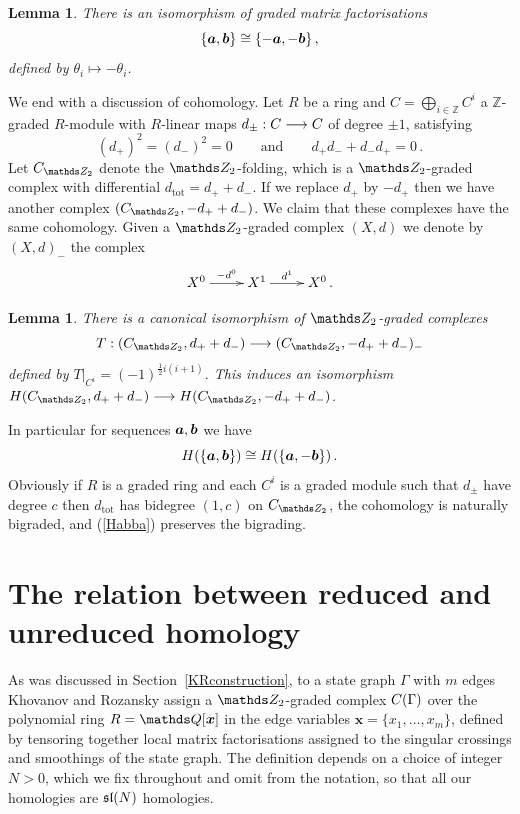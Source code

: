 \documentclass{compositio}
\newtheorem{lemma}[theorem]{Lemma}
\theoremstyle{definition}
\numberwithin{equation}{section}
\begin{document}
\begin{lemma}\label{lemma:cyclickos3} There is an isomorphism of graded matrix factorisations
\[
\{ \boldsymbol{a}, \boldsymbol{b} \} \cong \{ -\boldsymbol{a}, - \boldsymbol{b} \}\,,
\]
defined by $\theta_i \longmapsto - \theta_i$.
\end{lemma}

We end with a discussion of cohomology. Let $R$ be a ring and $C = \bigoplus_{i \in \mathds{Z}} C^i$ a $\mathds{Z}$-graded $R$-module with $R$-linear maps $d_{\pm}: C \longrightarrow C$ of degree $\pm 1$, satisfying
\[
(d_+)^2 = (d_{-})^2 = 0 \qquad \text{and} \qquad d_{+}d_{-} + d_{-}d_{+} = 0 \, .
\]
Let $C_{\Ztwo}$ denote the $\Ztwo$-folding, which is a $\Ztwo$-graded complex with differential $d_{\text{tot}} = d_+ + d_{-}$. If we replace $d_{+}$ by $-d_{+}$ then we have another complex $(C_{\Ztwo}, -d_{+} + d_{-})$. We claim that these complexes have the same cohomology. Given a $\Ztwo$-graded complex $(X,d)$ we denote by $(X,d)_{-}$ the complex
\[
\xymatrix{%
X^0 \ar[r]^-{-d^0} & X^1 \ar[r]^-{d^1} & X^0\,.
}
\]

\begin{lemma}\label{lemma:cyclickoszulsign} There is a canonical isomorphism of $\Ztwo$-graded complexes
\[
T: (C_{\Ztwo}, d_{+} + d_{-}) \lto (C_{\Ztwo}, -d_{+} + d_{-})_{-}
\]
defined by $T|_{C^i} = (-1)^{\frac{1}{2}i(i+1)}$. This induces an isomorphism $H(C_{\Ztwo}, d_{+} + d_{-}) \lto H(C_{\Ztwo}, -d_{+} + d_{-})$.
\end{lemma}

In particular for sequences $\boldsymbol{a}, \boldsymbol{b}$ we have
\begin{equation}
\label{Habba}
H(\{ \boldsymbol{a}, \boldsymbol{b} \}) \cong H(\{\boldsymbol{a}, -\boldsymbol{b}\}) \, .
\end{equation}
Obviously if $R$ is a graded ring and each $C^i$ is a graded module such that $d_{\pm}$ have degree $c$ then $d_{\text{tot}}$ has bidegree $(1,c)$ on $C_{\Ztwo}$, the cohomology is naturally bigraded, and (\ref{Habba}) preserves the bigrading.


\section{The relation between reduced and unreduced homology}
\label{relationReducedUnreduced}

As was discussed in Section~\ref{KRconstruction}, to a state graph $\Gamma$ with $m$ edges Khovanov and Rozansky assign a $\Ztwo$-graded complex $C(\Gamma)$ over the polynomial ring $R = \QQ[\boldsymbol{x}]$ in the edge variables $\boldsymbol{x} = \{x_1,\ldots,x_m\}$, defined by tensoring together local matrix factorisations assigned to the singular crossings and smoothings of the state graph. The definition depends on a choice of integer $N > 0$, which we fix throughout and omit from the notation, so that all our homologies are $\mathfrak{sl}(N)$ homologies.
\end{document}
